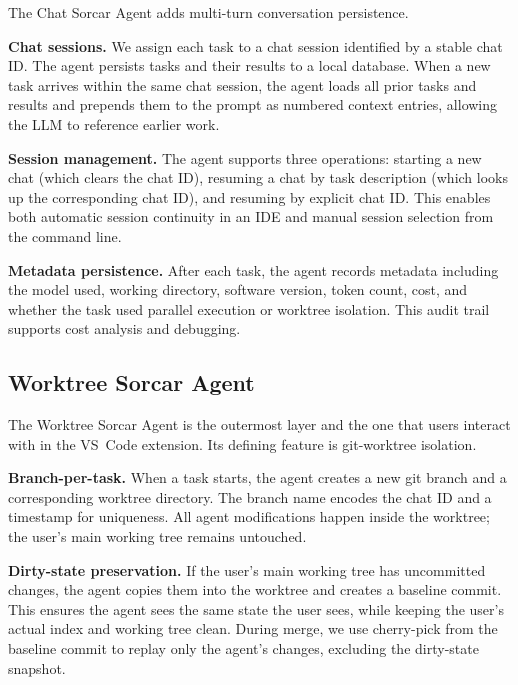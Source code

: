 \documentclass{article}
\begin{document}
The Chat Sorcar Agent adds multi-turn conversation persistence.

\textbf{Chat sessions.}  We assign each task to a chat session
identified by a stable chat ID.  The agent persists tasks and their
results to a local database.  When a new task arrives within the same
chat session, the agent loads all prior tasks and results and prepends
them to the prompt as numbered context entries, allowing the LLM to
reference earlier work.

\textbf{Session management.}  The agent supports three operations:
starting a new chat (which clears the chat ID), resuming a chat by
task description (which looks up the corresponding chat ID), and
resuming by explicit chat ID.  This enables both automatic session
continuity in an IDE and manual session selection from the command
line.

\textbf{Metadata persistence.}  After each task, the agent records
metadata including the model used, working directory, software version,
token count, cost, and whether the task used parallel execution or
worktree isolation.  This audit trail supports cost analysis and
debugging.

\subsection{Worktree Sorcar Agent}
\label{sec:worktree-agent}

The Worktree Sorcar Agent is the outermost layer and the one that
users interact with in the VS~Code extension.  Its defining feature is
git-worktree isolation.

\textbf{Branch-per-task.}  When a task starts, the agent creates a new
git branch and a corresponding worktree directory.  The branch name
encodes the chat ID and a timestamp for uniqueness.  All agent
modifications happen inside the worktree; the user's main working tree
remains untouched.

\textbf{Dirty-state preservation.}  If the user's main working tree
has uncommitted changes, the agent copies them into the worktree and
creates a baseline commit.  This ensures the agent sees the same state
the user sees, while keeping the user's actual index and working tree
clean.  During merge, we use cherry-pick from the baseline
commit to replay only the agent's changes, excluding the
dirty-state snapshot.
\end{document}
